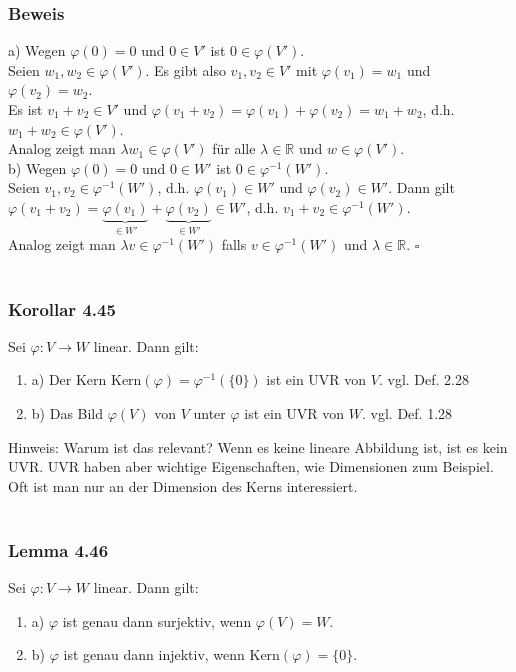 \documentclass{article}
\begin{document}
\subsubsection*{Beweis}
a) Wegen $\varphi(0) = 0$ und $0 \in V'$ ist $0 \in \varphi(V')$. \\
Seien $w_1, w_2 \in \varphi(V')$. Es gibt also $v_1, v_2 \in V'$ mit $\varphi(v_1) = w_1$ und $\varphi(v_2) = w_2$. \\
Es ist $v_1 + v_2 \in V'$ und $\varphi(v_1 + v_2) = \varphi(v_1) + \varphi(v_2) = w_1 + w_2$, d.h. $w_1 + w_2 \in \varphi(V')$. \\
Analog zeigt man $\lambda w_1 \in \varphi(V')$ für alle $\lambda \in \mathbb{R}$ und $w \in \varphi(V')$. \\
b) Wegen $\varphi(0) = 0$ und $0 \in W'$ ist $0 \in \varphi^{-1}(W')$. \\
Seien $v_1, v_2 \in \varphi^{-1}(W')$, d.h. $\varphi(v_1) \in W'$ und $\varphi(v_2) \in W'$. 
Dann gilt $\varphi(v_1 + v_2) = \underbrace{\varphi(v_1)}_{\in W'} + \underbrace{\varphi(v_2)}_{\in W'} \in W'$, d.h. $v_1 + v_2 \in \varphi^{-1}(W')$. \\
Analog zeigt man $\lambda v \in \varphi^{-1}(W')$ falls $v \in \varphi^{-1}(W')$ und $\lambda \in \mathbb{R}$. $\square$ \\
\\
\subsubsection*{Korollar 4.45}
Sei $\varphi: V \rightarrow W$ linear. Dann gilt: \\
\begin{enumerate}
    \item a) Der Kern $\text{Kern}(\varphi) = \varphi^{-1}(\{0\})$ ist ein UVR von $V$. vgl. Def. 2.28 \\
    \item b) Das Bild $\varphi(V)$ von $V$ unter $\varphi$ ist ein UVR von $W$. vgl. Def. 1.28 \\
\end{enumerate}
Hinweis: Warum ist das relevant? Wenn es keine lineare Abbildung ist, ist es kein UVR. UVR haben aber wichtige Eigenschaften, wie Dimensionen zum Beispiel. Oft ist man nur an der Dimension des Kerns interessiert. \\
\\
\subsubsection*{Lemma 4.46}
Sei $\varphi: V \rightarrow W$ linear. Dann gilt: \\
\begin{enumerate}
    \item a) $\varphi$ ist genau dann surjektiv, wenn $\varphi(V) = W$. \\
    \item b) $\varphi$ ist genau dann injektiv, wenn $\text{Kern}(\varphi) = \{0\}$. \\
\end{enumerate}
\end{document}
